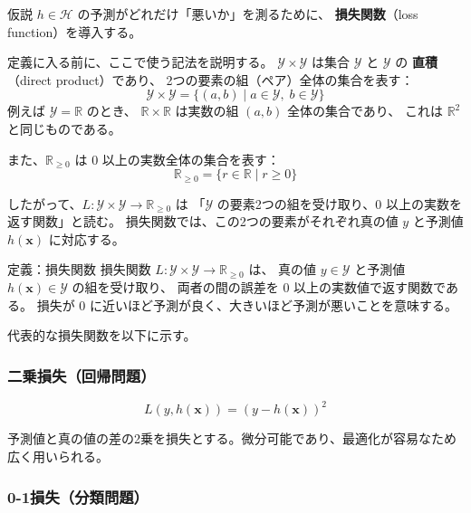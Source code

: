 仮説 $h \in \mathcal{H}$ の予測がどれだけ「悪いか」を測るために、
\textbf{損失関数}（loss function）を導入する。

定義に入る前に、ここで使う記法を説明する。
$\mathcal{Y} \times \mathcal{Y}$ は集合 $\mathcal{Y}$ と $\mathcal{Y}$ の
\textbf{直積}（direct product）であり、
2つの要素の組（ペア）全体の集合を表す：
\begin{equation}
  \mathcal{Y} \times \mathcal{Y} = \{ (a, b) \mid a \in \mathcal{Y},\; b \in \mathcal{Y} \}
\end{equation}
例えば $\mathcal{Y} = \mathbb{R}$ のとき、
$\mathbb{R} \times \mathbb{R}$ は実数の組 $(a, b)$ 全体の集合であり、
これは $\mathbb{R}^2$ と同じものである。

また、$\mathbb{R}_{\geq 0}$ は $0$ 以上の実数全体の集合を表す：
\begin{equation}
  \mathbb{R}_{\geq 0} = \{ r \in \mathbb{R} \mid r \geq 0 \}
\end{equation}

したがって、$L : \mathcal{Y} \times \mathcal{Y} \to \mathbb{R}_{\geq 0}$ は
「$\mathcal{Y}$ の要素2つの組を受け取り、$0$ 以上の実数を返す関数」と読む。
損失関数では、この2つの要素がそれぞれ真の値 $y$ と予測値 $h(\bm{x})$ に対応する。

\begin{itembox}[l]{定義：損失関数}
損失関数 $L : \mathcal{Y} \times \mathcal{Y} \to \mathbb{R}_{\geq 0}$ は、
真の値 $y \in \mathcal{Y}$ と予測値 $h(\bm{x}) \in \mathcal{Y}$ の組を受け取り、
両者の間の誤差を $0$ 以上の実数値で返す関数である。
損失が $0$ に近いほど予測が良く、大きいほど予測が悪いことを意味する。
\end{itembox}

代表的な損失関数を以下に示す。

\subsubsection{二乗損失（回帰問題）}

\begin{equation}
  L(y, h(\bm{x})) = (y - h(\bm{x}))^2
\end{equation}

予測値と真の値の差の2乗を損失とする。微分可能であり、最適化が容易なため広く用いられる。

\subsubsection{0-1損失（分類問題）}

